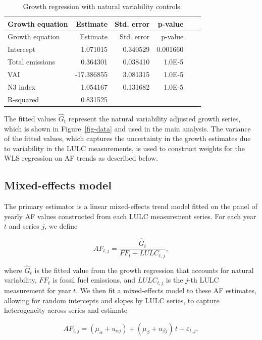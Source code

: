 \documentclass[
  12pt,
  letterpaper,
  DIV=11,
  numbers=noendperiod]{scrartcl}
\begin{document}
\begin{longtable}[]{@{}lrrrrr@{}}
\caption{Growth regression with natural variability
controls.}\label{tbl-growth-reg}\tabularnewline
\toprule\noalign{}
Growth equation & Estimate & Std. error & p-value & & \\
\midrule\noalign{}
\endfirsthead
\toprule\noalign{}
Growth equation & Estimate & Std. error & p-value & & \\
\midrule\noalign{}
\endhead
\bottomrule\noalign{}
\endlastfoot
Intercept & 1.071015 & 0.340529 & 0.001660 & & \\
Total emissions & 0.364301 & 0.038410 & 1.0E-5 & & \\
VAI & -17.386855 & 3.081315 & 1.0E-5 & & \\
N3 index & 1.054167 & 0.131682 & 1.0E-5 & & \\
R-squared & 0.831525 & & & & \\
\end{longtable}

The fitted values \(\hat{G}_t\) represent the natural variability
adjusted growth series, which is shown in Figure~\ref{fig-data} and used
in the main analysis. The variance of the fitted values, which captures
the uncertainty in the growth estimates due to variability in the LULC
measurements, is used to construct weights for the WLS regression on AF
trends as described below.

\subsection*{Mixed-effects model}\label{mixed-effects-model}

The primary estimator is a linear mixed-effects trend model fitted on
the panel of yearly AF values constructed from each LULC measurement
series. For each year \(t\) and series \(j\), we define

\[
AF_{t,j} = \frac{\hat{G}_t}{FF_t + LULC_{t,j}},
\]

where \(\hat{G}_t\) is the fitted value from the growth regression that
accounts for natural variability, \(FF_t\) is fossil fuel emissions, and
\(LULC_{t,j}\) is the \(j\)-th LULC measurement for year \(t\). We then
fit a mixed-effects model to these AF estimates, allowing for random
intercepts and slopes by LULC series, to capture heterogeneity across
series and estimate

\[
AF_{t,j} = (\mu_\alpha + u_{\alpha j}) + (\mu_\beta + u_{\beta j})\,t + \varepsilon_{t,j},
\]
\end{document}
